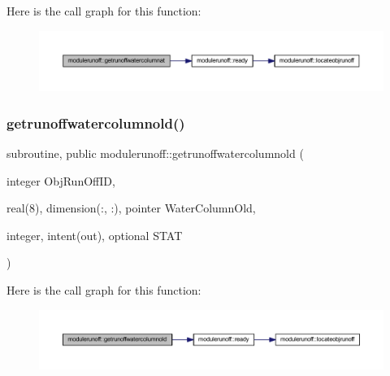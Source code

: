 Here is the call graph for this function\+:\nopagebreak
\begin{figure}[H]
\begin{center}
\leavevmode
\includegraphics[width=350pt]{namespacemodulerunoff_a6f2a352071be64f678c58f0707749d4f_cgraph}
\end{center}
\end{figure}
\mbox{\label{namespacemodulerunoff_a4718c4b469bb2480c20b88afa22ebc29}} 
\subsubsection{\texorpdfstring{getrunoffwatercolumnold()}{getrunoffwatercolumnold()}}
{\footnotesize\ttfamily subroutine, public modulerunoff\+::getrunoffwatercolumnold (\begin{DoxyParamCaption}\item[{integer}]{Obj\+Run\+Off\+ID,  }\item[{real(8), dimension(\+:, \+:), pointer}]{Water\+Column\+Old,  }\item[{integer, intent(out), optional}]{S\+T\+AT }\end{DoxyParamCaption})}

Here is the call graph for this function\+:\nopagebreak
\begin{figure}[H]
\begin{center}
\leavevmode
\includegraphics[width=350pt]{namespacemodulerunoff_a4718c4b469bb2480c20b88afa22ebc29_cgraph}
\end{center}
\end{figure}
\mbox{\label{namespacemodulerunoff_a739d861fb3d51996841a644f1567506e}} 
